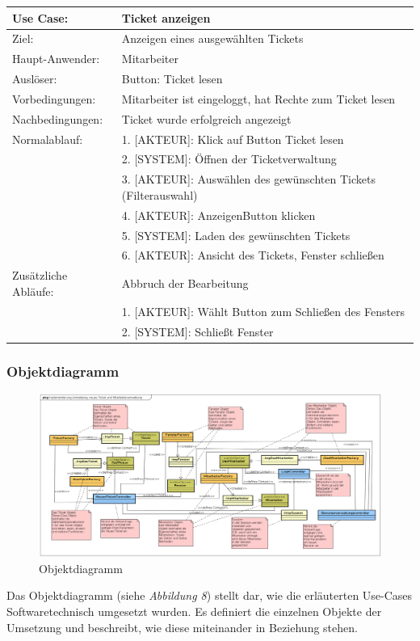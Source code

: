 \documentclass[12pt, a4paper]{article}
\begin{document}
 
\begin{table}[H]
	\begin{center}
		\begin{tabular}{|p{3.8cm}|p{12cm}|}
		\hline
			\cellcolor{Hellgrau}Use Case: & \cellcolor{Hellgrau}Ticket anzeigen \\
		\hline
  			Ziel: & Anzeigen eines ausgewählten Tickets\\
 		\hline
  			Haupt-Anwender: & Mitarbeiter  \\
   		\hline
  			Auslöser: & Button: \glqq Ticket lesen\grqq \\
   		\hline
  			Vorbedingungen: & Mitarbeiter ist eingeloggt, hat Rechte zum Ticket lesen  \\
   		\hline
  			Nachbedingungen: & Ticket wurde erfolgreich angezeigt \\
   		\hline
  			Normalablauf:
 			& 1. [AKTEUR]: Klick auf Button \glqq Ticket lesen\grqq  \\
 			& 2. [SYSTEM]: Öffnen der Ticketverwaltung  \\
 			& 3. [AKTEUR]: Auswählen des gewünschten Tickets (Filterauswahl)  \\
 			& 4. [AKTEUR]: \glqq Anzeigen\grqq  Button klicken   \\
 			& 5. [SYSTEM]: Laden des gewünschten Tickets\\
 			& 6. [AKTEUR]: Ansicht des Tickets, Fenster schließen\\
   		\hline
  			Zusätzliche Abläufe: & Abbruch der Bearbeitung \\
 			& 1. [AKTEUR]: Wählt Button zum Schließen des Fensters  \\
 			& 2. [SYSTEM]: Schließt Fenster  \\
   		\hline
		\end{tabular}
	\end{center}
\end{table}
 
\subsubsection{Objektdiagramm}
\begin{figure}[H]
	\begin{center}
		\includegraphics[width=208mm,angle=90]{Bilder/ObjektDiagramm.png}
	\end{center}
	\caption{Objektdiagramm}
\end{figure}
Das Objektdiagramm (siehe\textit{ Abbildung 8}) stellt dar, wie die erläuterten Use-Cases Softwaretechnisch umgesetzt wurden. Es definiert die einzelnen Objekte der Umsetzung und beschreibt, wie diese miteinander in Beziehung stehen.
\end{document}
